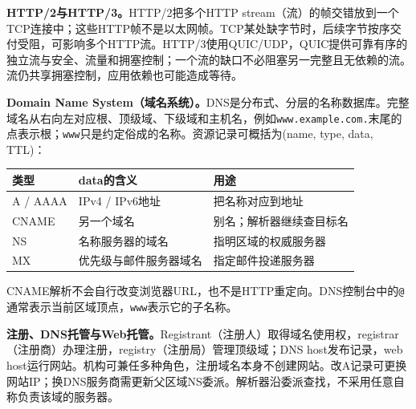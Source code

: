 \textbf{HTTP/2与HTTP/3。}HTTP/2把多个HTTP stream（流）的帧交错放到一个TCP连接中；这些HTTP帧不是以太网帧。TCP某处缺字节时，后续字节按序交付受阻，可影响多个HTTP流。HTTP/3使用QUIC/UDP，QUIC提供可靠有序的独立流与安全、流量和拥塞控制；一个流的缺口不必阻塞另一完整且无依赖的流。流仍共享拥塞控制，应用依赖也可能造成等待。


\textbf{Domain Name System（域名系统）。}DNS是分布式、分层的名称数据库。完整域名从右向左对应根、顶级域、下级域和主机名，例如\texttt{www.example.com.}末尾的点表示根；\texttt{www}只是约定俗成的名称。资源记录可概括为(name, type, data, TTL)：
\begin{center}
\small
\begin{tabularx}{\textwidth}{@{}>{\raggedright\arraybackslash}p{1.8cm}p{4.1cm}X@{}}
\toprule
类型 & data的含义 & 用途 \\
\midrule
A / AAAA & IPv4 / IPv6地址 & 把名称对应到地址 \\
CNAME & 另一个域名 & 别名；解析器继续查目标名 \\
NS & 名称服务器的域名 & 指明区域的权威服务器 \\
MX & 优先级与邮件服务器域名 & 指定邮件投递服务器 \\
\bottomrule
\end{tabularx}
\end{center}
CNAME解析不会自行改变浏览器URL，也不是HTTP重定向。DNS控制台中的\texttt{@}通常表示当前区域顶点，\texttt{www}表示它的子名称。

\textbf{注册、DNS托管与Web托管。}Registrant（注册人）取得域名使用权，registrar（注册商）办理注册，registry（注册局）管理顶级域；DNS host发布记录，web host运行网站。机构可兼任多种角色，注册域名本身不创建网站。改A记录可更换网站IP；换DNS服务商需更新父区域NS委派。解析器沿委派查找，不采用任意自称负责该域的服务器。

